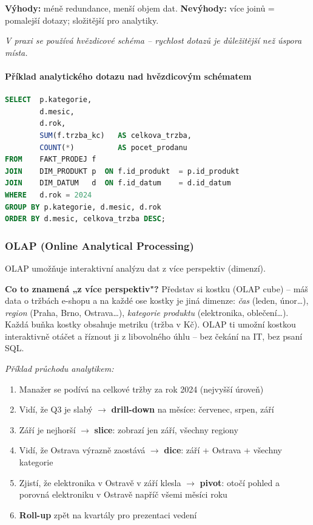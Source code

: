 \textbf{Výhody:} méně redundance, menší objem dat.
\textbf{Nevýhody:} více joinů = pomalejší dotazy; složitější pro analytiky.

\textit{V praxi se používá hvězdicové schéma -- rychlost dotazů je důležitější než úspora místa.}

\paragraph{Příklad analytického dotazu nad hvězdicovým schématem}
\begin{lstlisting}[language=SQL, caption=Tržby podle kategorie a měsíce -- typický DWH dotaz]
SELECT  p.kategorie,
        d.mesic,
        d.rok,
        SUM(f.trzba_kc)   AS celkova_trzba,
        COUNT(*)          AS pocet_prodanu
FROM    FAKT_PRODEJ f
JOIN    DIM_PRODUKT p  ON f.id_produkt  = p.id_produkt
JOIN    DIM_DATUM   d  ON f.id_datum    = d.id_datum
WHERE   d.rok = 2024
GROUP BY p.kategorie, d.mesic, d.rok
ORDER BY d.mesic, celkova_trzba DESC;
\end{lstlisting}

\subsubsection{OLAP (Online Analytical Processing)}

OLAP umožňuje interaktivní analýzu dat z více perspektiv (dimenzí).

\textbf{Co to znamená „z více perspektiv"?} Představ si kostku (OLAP cube) -- máš data o tržbách
e-shopu a na každé ose kostky je jiná dimenze: \textit{čas} (leden, únor\ldots), \textit{region}
(Praha, Brno, Ostrava\ldots), \textit{kategorie produktu} (elektronika, oblečení\ldots).
Každá buňka kostky obsahuje metriku (tržba v Kč). OLAP ti umožní kostkou interaktivně
otáčet a říznout ji z libovolného úhlu -- bez čekání na IT, bez psaní SQL.

\textit{Příklad průchodu analytikem:}
\begin{enumerate}
  \item Manažer se podívá na celkové tržby za rok 2024 (nejvyšší úroveň)
  \item Vidí, že Q3 je slabý $\to$ \textbf{drill-down} na měsíce: červenec, srpen, září
  \item Září je nejhorší $\to$ \textbf{slice}: zobrazí jen září, všechny regiony
  \item Vidí, že Ostrava výrazně zaostává $\to$ \textbf{dice}: září + Ostrava + všechny kategorie
  \item Zjistí, že elektronika v Ostravě v září klesla $\to$ \textbf{pivot}: otočí pohled
    a porovná elektroniku v Ostravě napříč všemi měsíci roku
  \item \textbf{Roll-up} zpět na kvartály pro prezentaci vedení
\end{enumerate}


